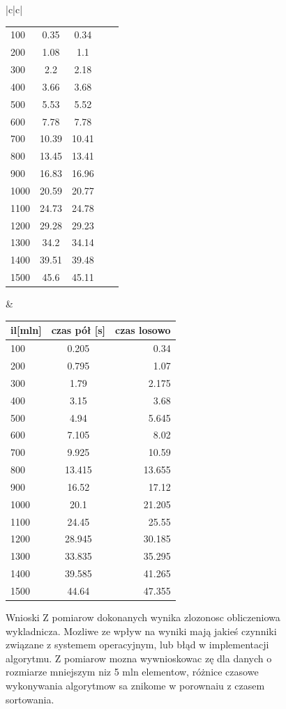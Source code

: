 \documentclass[a4paper,11pt]{report}
\begin{document}
\begin{figure}
\begin{center}
\begin{tabular}{|c|c|}
\begin{tabular}{|l|c|c|c|r|}
100  & 0.35 & 0.34\\
200  & 1.08 &1.1\\
300  & 2.2 &2.18\\
400  & 3.66 &3.68\\
500  & 5.53 &5.52\\
600  & 7.78 &7.78\\
700  & 10.39 &10.41\\
800  & 13.45 &13.41\\
900  & 16.83 &16.96\\
1000 & 20.59 &20.77\\
1100 & 24.73 &24.78\\
1200 & 29.28 &29.23\\
1300 & 34.2 &34.14\\
1400 & 39.51 &39.48\\
1500 & 45.6 &45.11\\
\hline
\end{tabular}
&
       \begin{tabular}{|l|c|r|}
\hline
il[mln] & czas pół [s] & czas losowo \\
\hline
100 & 0.205& 0.34\\
200  & 0.795& 1.07\\
300  & 1.79& 2.175\\
400  & 3.15&  3.68\\
500  & 4.94&  5.645\\
600  & 7.105& 8.02\\
700  & 9.925& 10.59\\
800  & 13.415& 13.655\\
900  & 16.52&  17.12\\
1000  & 20.1& 21.205\\
1100  & 24.45& 25.55\\
1200  & 28.945& 30.185\\
1300  & 33.835&  35.295\\
1400  & 39.585& 41.265\\
1500  & 44.64& 47.355\\

\hline

\end{tabular}
\newline

\end{tabular}
\newline
  \end{center}
\end{figure}
\begin{figure}

\begin{center}


Wnioski \newline
Z pomiarow dokonanych wynika zlozonosc obliczeniowa wykladnicza. Mozliwe ze wpływ na wyniki mają jakieś czynniki związane z systemem operacyjnym, lub błąd w implementacji algorytmu. Z pomiarow mozna wywnioskowac zę dla danych o rozmiarze mniejszym niz 5 mln elementow, różnice czasowe wykonywania algorytmow sa znikome w porownaiu z czasem sortowania.
\end{center}
\end{figure}
\end{document}
